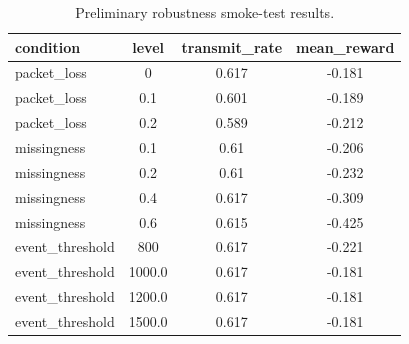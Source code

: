 \begin{table}[t]
\centering
\caption{Preliminary robustness smoke-test results.}
\label{tab:robustness}
\begin{tabular}{lccc}
\toprule
condition & level & transmit\_rate & mean\_reward \\
\midrule
packet\_loss & 0 & 0.617 & -0.181 \\
packet\_loss & 0.1 & 0.601 & -0.189 \\
packet\_loss & 0.2 & 0.589 & -0.212 \\
missingness & 0.1 & 0.61 & -0.206 \\
missingness & 0.2 & 0.61 & -0.232 \\
missingness & 0.4 & 0.617 & -0.309 \\
missingness & 0.6 & 0.615 & -0.425 \\
event\_threshold & 800 & 0.617 & -0.221 \\
event\_threshold & 1000.0 & 0.617 & -0.181 \\
event\_threshold & 1200.0 & 0.617 & -0.181 \\
event\_threshold & 1500.0 & 0.617 & -0.181 \\
\bottomrule
\end{tabular}
\end{table}
